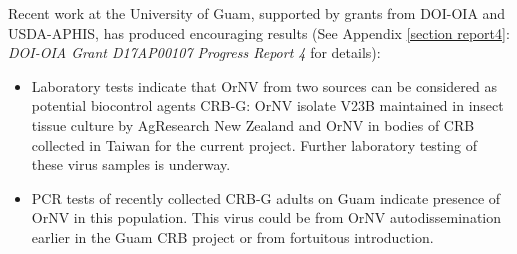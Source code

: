 \documentclass[12pt,letterpaper,english,bibliography=totocnumbered, abstract=on]{scrartcl}
\begin{document}
Recent work at the University of Guam, supported by grants from DOI-OIA and USDA-APHIS, has produced encouraging results (See Appendix \ref{section report4}: \textit{DOI-OIA Grant D17AP00107 Progress Report 4} for details):

\begin{itemize}
	
\item	Laboratory tests indicate that OrNV from two sources can be considered as potential biocontrol agents CRB-G: OrNV isolate V23B maintained in insect tissue culture by AgResearch New Zealand and OrNV in bodies of CRB collected in Taiwan for the current project. Further laboratory testing of these virus samples is underway. 
	
\item	PCR tests of recently collected CRB-G adults on Guam indicate presence of OrNV in this population. This virus could be from OrNV autodissemination earlier in the Guam CRB project or from fortuitous introduction.

\end{itemize}
	
\end{document}
